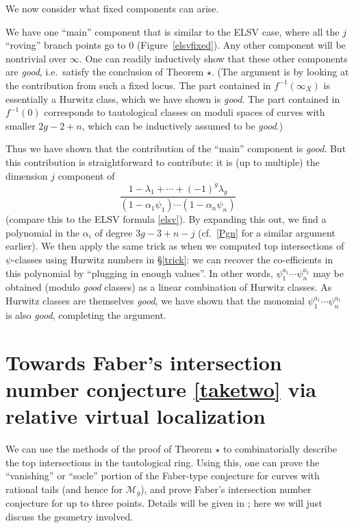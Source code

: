\documentclass[12pt,letterpaper]{amsart}
\newcommand{\cm}{{\mathcal{M}}}
\newcommand{\al}{\alpha}
\newcommand{\la}{\lambda}
\begin{document}
{We now consider what fixed components can arise.  

We have one ``main'' component that is similar to the ELSV case, where
all the $j$ ``roving'' branch points go to $0$
(Figure~\ref{elsvfixed}).  Any other component will be nontrivial
over $\infty$.  One can readily inductively show that these other
components are {\em good}, i.e.\ satisfy the conclusion of Theorem
$\star$.  (The argument is by looking at the contribution from such a
fixed locus.  The part contained in $f^{-1}(\infty_X)$ is essentially
a Hurwitz class, which we have shown is {\em good}.  The part contained in
$f^{-1}(0)$ corresponds to tautological classes on moduli spaces of
curves with smaller $2g-2+n$, which can be inductively assumed to 
be {\em good}.)

Thus we have shown that the contribution of the ``main'' component is
{\em good}.  But this contribution is straightforward to contribute:
it is (up to multiple)
the dimension $j$ component of 
$$
\frac { 1 - \la_1 + \cdots + (-1)^g \la_g}
{ ( 1 - \al_1 \psi_1) \cdots (1 - \al_n \psi_n)}
$$
(compare this to the ELSV formula \eqref{elsv}).  By expanding this
out, we find a polynomial in the $\al_i$ of degree $3g-3+n-j$ (cf.\
\eqref{Pgn} for a similar argument earlier).  We then apply the same
trick as when we computed top intersections of $\psi$-classes using
Hurwitz numbers in \S \ref{trick}: we can recover the
co-efficients in this polynomial by ``plugging in enough values''.
In other words, 
$\psi_1^{a_1} \cdots \psi_n^{a_1}$ may be obtained (modulo
{\em good} classes) as a linear combination  of Hurwitz classes.
As Hurwitz classes are themselves {\em good}, we have shown that the monomial
$\psi_1^{a_1} \cdots \psi_n^{a_1}$ is also {\em good}, completing the argument.

\section{Towards Faber's intersection number conjecture \ref{taketwo} via
relative virtual localization}

We can use the methods of the proof of Theorem $\star$ to
combinatorially describe the top intersections in the tautological
ring.  Using this, one can prove the ``vanishing'' or ``socle''
portion of the Faber-type conjecture for curves with rational tails
(and hence for $\cm_g$), and prove Faber's intersection number
conjecture for up to three points.  Details will be given in
\cite{gjv}; here we will just discuss the geometry involved.

}
\end{document}
